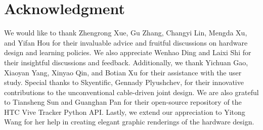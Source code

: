 \section*{Acknowledgment}
We would like to thank Zhengrong Xue, Gu Zhang, Changyi Lin, Mengda Xu, and Yifan Hou for their invaluable advice and fruitful discussions on hardware design and learning policies.
%
We also appreciate Wenhao Ding and Laixi Shi for their insightful discussions and feedback.
%
Additionally, we thank Yichuan Gao, Xiaoyan Yang, Xinyao Qin, and Botian Xu for their assistance with the user study.
%
Special thanks to Skyentific, Gennady Plyushchev, for their innovative contributions to the unconventional cable-driven joint design.
%
We are also grateful to Tiansheng Sun and Guanghan Pan for their open-source repository of the HTC Vive Tracker Python API.
%
Lastly, we extend our appreciation to Yitong Wang for her help in creating elegant graphic renderings of the hardware design.
